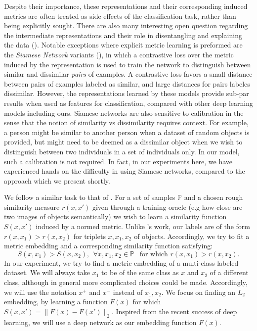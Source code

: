 \documentclass{article} %
\begin{document}
Despite their importance, these representations and their corresponding induced metrics are often  
treated as side effects of the  classification task, rather than being explicitly sought.
There are also many interesting open question regarding the intermediate representations and their role in disentangling and explaining the data (\citet{Bengio2013}).
Notable exceptions where explicit metric learning is preformed are the \emph{Siamese Network} variants (\citet{bromley1993signature,Chopra2005,hadsell2006dimensionality}), in which a contrastive loss over 
the metric induced by the representation  is used to train the network to distinguish between similar and dissimilar \emph{pairs} of examples.  A contrastive loss favors a small distance between pairs of examples
labeled as similar, and large distances for pairs labeles dissimilar.
However, the representations learned by these models provide sub-par results when used as features for classification, compared with other deep learning models including ours. Siamese networks are also sensitive to calibration in the sense that the notion of similarity vs dissimilarity requires context.  
For example, a person might be similar to another person when a dataset of random objects is provided, but might need to be deemed as a dissimilar object when we wish to distinguish between two individuals in a set of individuals only. %
In our model, such a calibration is not required.
In fact, in our experiments here, we have experienced hands on the difficulty in using Siamese networks, compared to the approach
which we present shortly.

We follow a similar task to that of \citet{chechik2010large}. For a set of samples $\mathbb{P}$ and a chosen rough similarity measure $r(x,x')$ given through a training oracle
(e.g how close are two images of objects semantically) we wish to learn a similarity function $S(x,x')$ induced by a normed metric.
Unlike  \citet{chechik2010large}'s work, our labels are of the form $r(x,x_1)>r(x,x_2)$ for triplets $x,x_1,x_2$ of objects.
Accordingly, we try to fit a metric embedding and a corresponding similarity function satisfying:
$$ S(x,x_1)>S(x,x_2), \ \ \forall x,x_1,x_2 \in \mathbb{P} \ \ \text{ for which } r(x,x_1)>r(x,x_2).$$
In our experiment, we try to find a metric embedding of a multi-class labeled dataset. We will always take $x_1$ to be of the same class as $x$ and $x_2$ of a different class, although in general more complicated choices could be made.
Accordingly, we will use the notation $x^{+}$ and $x^{-}$ instead of $x_1, x_2$.
We focus on finding an $L_2$ embedding, by learning a function $F(x)$ for which $S(x,x')=\|F(x)-F(x')\|_2$.
Inspired from the recent success of deep learning, we will use a deep network as our embedding function $F(x)$.
\end{document}
